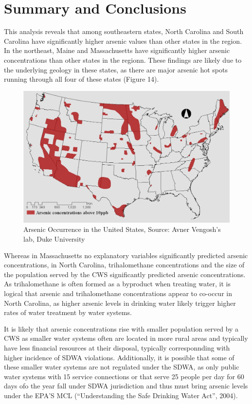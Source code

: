 \documentclass[12pt,]{article}
\begin{document}
\newpage

\hypertarget{summary-and-conclusions}{%
\section{Summary and Conclusions}\label{summary-and-conclusions}}

This analysis reveals that among southeastern states, North Carolina and
South Carolina have significantly higher arsenic values than other
states in the region. In the northeast, Maine and Massachusetts have
significantly higher arsenic concentrations than other states in the
regionn. These findings are likely due to the underlying geology in
these states, as there are major arsenic hot spots running through all
four of these states (Figure 14).

\begin{figure}
\centering
\includegraphics{../Data/Processed/ArsenicFigure.png}
\caption{Arsenic Occurrence in the United States, Source: Avner
Vengosh's lab, Duke University}
\end{figure}

Whereas in Massachusetts no explanatory variables significantly
predicted arsenic concentrations, in North Carolina, trihalomethane
concentrations and the size of the population served by the CWS
significantly predicted arsenic concentrations. As trihalomethane is
often formed as a byproduct when treating water, it is logical that
arsenic and trihalomethane concentrations appear to co-occur in North
Carolina, as higher arsenic levels in drinking water likely trigger
higher rates of water treatment by water systems.

It is likely that arsenic concentrations rise with smaller population
served by a CWS as smaller water systems often are located in more rural
areas and typically have less financial resources at their disposal,
typically corresponnding with higher incidence of SDWA violations.
Additionally, it is possible that some of these smaller water systems
are not regulated under the SDWA, as only public water systems with 15
service connections or that serve 25 people per day for 60 days ofo the
year fall under SDWA jurisdiction and thus must bring arsenic levels
under the EPA'S MCL (``Understanding the Safe Drinking Water Act'',
2004).
\end{document}
